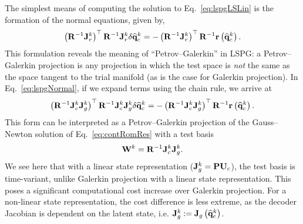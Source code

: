 The simplest means of computing the solution to Eq.~\ref{eq:lspgLSLin} is the formation of the normal equations, given by,
%
\begin{equation}\label{eq:lspgNormal}
    \left(\resScaleInv \jacobRes^{\newtonIdx}\right)^\top \resScaleInv \jacobRes^{\newtonIdx} \delta \consVecCoef^{\newtonIdx} = -\left(\resScaleInv \jacobRes^{\newtonIdx}\right)^\top \resScaleInv \resFunc{\consVecCoef^{\newtonIdx}}.
\end{equation}
%
This formulation reveals the meaning of ``Petrov--Galerkin'' in LSPG: a Petrov--Galerkin projection is any projection in which the test space is \textit{not} the same as the space tangent to the trial manifold (as is the case for Galerkin projection). In Eq.~\ref{eq:lspgNormal}, if we expand terms using the chain rule, we arrive at
%
\begin{equation}
    \left(\resScaleInv \jacobCons^{\newtonIdx} \jacobDecode^{\newtonIdx}\right)^\top \resScaleInv \jacobCons^{\newtonIdx} \jacobDecode^{\newtonIdx} \delta \consVecCoef^{\newtonIdx} = -\left(\resScaleInv \jacobCons^{\newtonIdx} \jacobDecode^{\newtonIdx}\right)^\top \resScaleInv \resFunc{\consVecCoef^{\newtonIdx}}.
\end{equation}
%
This form can be interpreted as a Petrov--Galerkin projection of the Gauss--Newton solution of Eq.~\ref{eq:contRomRes} with a test basis
%
\begin{equation}
    \testBasis^\newtonIdx = \resScaleInv \jacobCons^\newtonIdx \jacobDecode^{\newtonIdx}.
\end{equation}
%
We see here that with a linear state representation ($\jacobDecode^{\newtonIdx} = \consScale \consTrial$), the test basis is time-variant, unlike Galerkin projection with a linear state representation. This poses a significant computational cost increase over Galerkin projection. For a non-linear state representation, the cost difference is less extreme, as the decoder Jacobian is dependent on the latent state, i.e. $\mathbf{J}_{g}^{k} := \mathbf{J}_{g} \left(\mathbf{\widehat{q}}_{c}^{k}\right)$.

